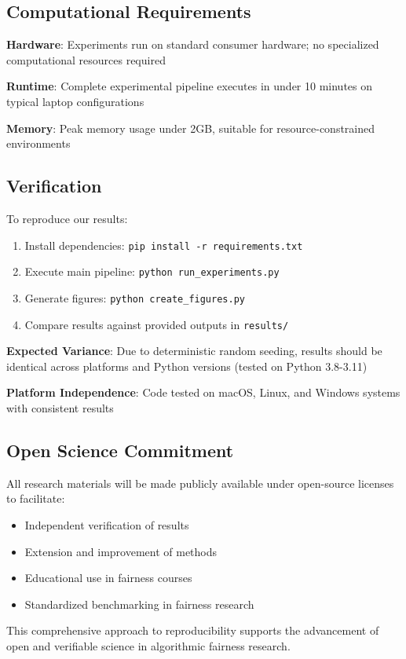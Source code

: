 \subsection*{Computational Requirements}

\textbf{Hardware}: Experiments run on standard consumer hardware; no specialized computational resources required

\textbf{Runtime}: Complete experimental pipeline executes in under 10 minutes on typical laptop configurations

\textbf{Memory}: Peak memory usage under 2GB, suitable for resource-constrained environments

\subsection*{Verification}

To reproduce our results:

\begin{enumerate}
\item Install dependencies: \texttt{pip install -r requirements.txt}
\item Execute main pipeline: \texttt{python run\_experiments.py}
\item Generate figures: \texttt{python create\_figures.py}
\item Compare results against provided outputs in \texttt{results/}
\end{enumerate}

\textbf{Expected Variance}: Due to deterministic random seeding, results should be identical across platforms and Python versions (tested on Python 3.8-3.11)

\textbf{Platform Independence}: Code tested on macOS, Linux, and Windows systems with consistent results

\subsection*{Open Science Commitment}

All research materials will be made publicly available under open-source licenses to facilitate:
\begin{itemize}
\item Independent verification of results
\item Extension and improvement of methods
\item Educational use in fairness courses
\item Standardized benchmarking in fairness research
\end{itemize}

This comprehensive approach to reproducibility supports the advancement of open and verifiable science in algorithmic fairness research.